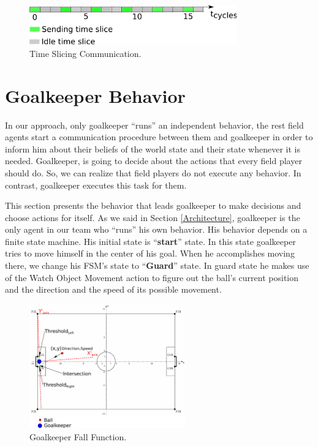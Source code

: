 \begin{figure}[t!]
\centering
  \includegraphics[width=0.8\textwidth]{Chapter3/figures/MAC.pdf}  
  \caption{Time Slicing Communication.}
  \label{fig:TimeSlicing}
\end{figure} 


\section{Goalkeeper Behavior}

In our approach, only goalkeeper ``runs'' an independent behavior, the rest field agents start a communication procedure between them and goalkeeper in order to inform him about their beliefs of the world state and their state whenever it is needed. Goalkeeper, is going to decide about the actions that every field player should do. So, we can realize that field players do not execute any behavior. In contrast, goalkeeper executes this task for them.

This section presents the behavior that leads goalkeeper to make decisions and choose actions for itself. As we said in Section \ref{Architecture}, goalkeeper is the only agent in our team who ``runs'' his own behavior. His behavior depends on a finite state machine. His initial state is ``\textbf{start}'' state. In this state goalkeeper tries to move himself in the center of his goal. When he accomplishes moving there, we change his FSM's state to ``\textbf{Guard}'' state. In guard state he makes use of the Watch Object Movement action to figure out the ball's current position and the  direction and the speed of its possible movement.

\begin{figure}[t!]
\centering
  \includegraphics[trim = 0cm 0cm 10cm 0cm, clip,width=0.6\textwidth]{Chapter3/figures/Goalie.pdf}  
  \caption{Goalkeeper Fall Function.}
  \label{fig:Goalkeeper}
\end{figure} 

